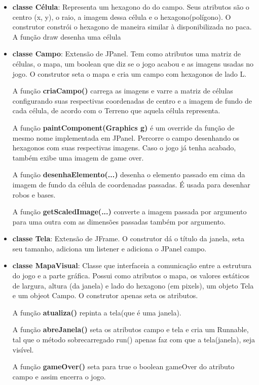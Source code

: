 \documentclass[11pt]{article}
\begin{document}
\begin{itemize}

	\item \textbf{classe Célula}: Representa um hexagono do do campo. Seus atributos são o  centro (x, y), o raio, a imagem dessa célula e o hexagono(polígono). O construtor constrói o hexagono de maneira similar à disponibilizada no paca. A função draw desenha uma célula

	\item \textbf{classe Campo}: Extensão de JPanel. Tem como atributos uma matriz de células, o mapa, um boolean que diz se o jogo acabou e as imagens usadas no jogo. O construtor seta o mapa e cria um campo com hexagonos de lado L. 
	
	A função \textbf{\color{red}criaCampo()} carrega as imagens e varre a matriz de células configurando suas respectivas coordenadas de centro e a imagem de fundo de cada célula, de acordo com o Terreno que aquela célula representa.
	
	A função \textbf{\color{red}paintComponent(Graphics g)} é um override da função de mesmo nome implementada em JPanel. Percorre o campo desenhando os hexagonos com suas respectivas imagens. Caso o jogo já tenha acabado, também exibe uma imagem de game over.
	
	A função \textbf{\color{red}desenhaElemento(...)} desenha o elemento passado em cima da imagem de fundo da célula de coordenadas passadas. É usada para desenhar robos e bases.
	
	A função \textbf{\color{red}getScaledImage(...)} converte a imagem passada por argumento para uma outra com as dimensões passadas também por argumento.

	\item \textbf{classe Tela}: Extensão de JFrame. O construtor dá o título da janela, seta seu tamanho, adiciona um listener e adiciona o JPanel campo.

	\item \textbf{classe MapaVisual}: Classe que interfaceia a comunicação entre a estrutura do jogo e a parte gráfica. Possui como atributos o mapa, os valores estáticos de largura, altura (da janela) e lado do hexagono (em pixels), um objeto Tela e um objeot Campo.	O construtor apenas seta os atributos.
	
	A função \textbf{\color{red}atualiza()} repinta a tela(que é uma janela).
	
	A função \textbf{\color{red}abreJanela()} seta os atributos campo e tela e cria um Runnable, tal que o método sobrecarregado run() apenas faz com que a tela(janela), seja visível.
	
	A função \textbf{\color{red}gameOver()} seta para true o boolean gameOver do atributo campo e assim encerra o jogo.

\end{itemize}
\end{document}
